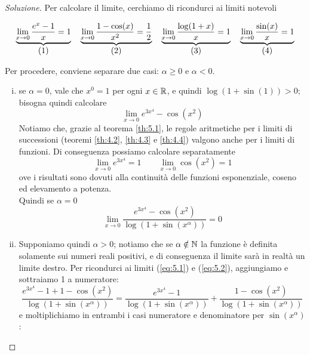 \begin{proof}[Soluzione]
    Per calcolare il limite, cerchiamo di ricondurci ai limiti notevoli
    \begin{tcolorbox}
        \[
        \underbrace{\lim_{x\to 0} \frac{e^x-1}{x} = 1}_{\stepcounter{equation}\mbox{(\theequation)}} \quad \underbrace{\lim_{x\to 0} \frac{1-\cos(x)}{x^2} = \frac{1}{2}}_{\stepcounter{equation}\mbox{(\theequation)}} \quad \underbrace{\lim_{x\to 0} \frac{\log(1+x)}{x} = 1}_{\stepcounter{equation}\mbox{(\theequation)}}
        \quad \underbrace{\lim_{x\to 0}  \frac{\sin(x)}{x} = 1}_{\stepcounter{equation}\mbox{(\theequation)}}
        \]
        \addtocounter{equation}{-3}\label{eq:5.1}
        \addtocounter{equation}{0}\label{eq:5.2}
        \addtocounter{equation}{0}\label{eq:5.3}
        \addtocounter{equation}{0}\label{eq:5.4}
    \end{tcolorbox}
    Per procedere, conviene separare due casi: $\alpha\ge 0$ e $\alpha<0$.
    \begin{enumerate}[(i)]
        \item se $\alpha=0$, vale che $x^0=1$ per ogni $x\in\amsbb{R}$, e quindi $\log(1+\sin(1))> 0$; bisogna quindi calcolare
        \[
        \lim_{x\to 0}e^{3x^4}-\cos(x^2)
        \]
        Notiamo che, grazie al teorema \ref{th:5.1}, le regole aritmetiche per i limiti di successioni (teoremi \ref{th:4.2}, \ref{th:4.3} e \ref{th:4.4}) valgono anche per i limiti di funzioni. Di conseguenza possiamo calcolare separatamente 
        \[
        \lim_{x\to0}e^{3x^4} = 1 \qquad \lim_{x\to 0}\cos(x^2) = 1
        \]
        ove i risultati sono dovuti alla continuità delle funzioni esponenziale, coseno ed elevamento a potenza.\\
        Quindi se $\alpha=0$
        \[
        \lim_{x\to 0}\frac{e^{3x^4}-\cos(x^2)}{\log(1+\sin(x^\alpha))} = 0
        \]
        \item Supponiamo quindi $\alpha>0$; notiamo che se $\alpha\notin \amsbb{N}$ la funzione è definita solamente sui numeri reali positivi, e di conseguenza il limite sarà in realtà un limite destro. Per ricondurci ai limiti (\ref{eq:5.1}) e (\ref{eq:5.2}), aggiungiamo e sottraiamo 1 a numeratore:
        \[
        \frac{e^{3x^4}-1+1-\cos(x^2)}{\log(1+\sin(x^\alpha))} = \frac{e^{3x^4}-1}{\log(1+\sin(x^\alpha))}+\frac{1-\cos(x^2)}{\log(1+\sin(x^\alpha))}
        \]
        e moltiplichiamo in entrambi i casi numeratore e denominatore per $\sin(x^\alpha)$:
        \[
\]
\end{enumerate}
\end{proof}
